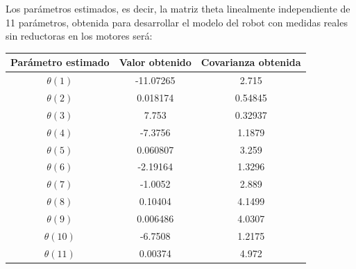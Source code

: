 Los parámetros estimados, es decir, la matriz theta linealmente independiente de 11 parámetros, obtenida para desarrollar el modelo del robot con medidas reales sin reductoras en los motores será:

\begin{center}
	
	\begin{tabular}{| c | c | c |}
		
		
		
		\hline
		
		Parámetro estimado & Valor obtenido & Covarianza obtenida \\
		
		\hline
		
		$\theta(1) $ & -11.07265 & 2.715 \\
		
		\hline
		
		$\theta(2) $ & 0.018174 & 0.54845 \\
		
		\hline
		
		$\theta(3) $ & 7.753 & 0.32937 \\
		
		\hline
		
		$\theta(4) $ & -7.3756 & 1.1879 \\
		
		\hline
		
		$\theta(5) $ & 0.060807 & 3.259 \\
		
		\hline
		
		$\theta(6) $ & -2.19164 & 1.3296 \\
		
		\hline
		
		$\theta(7) $ & -1.0052 & 2.889 \\
		
		\hline
		
		$\theta(8) $ & 0.10404 & 4.1499 \\
		
		\hline
		
		$\theta(9) $ & 0.006486 & 4.0307 \\
		
		\hline
		
		$\theta(10) $ & -6.7508 & 1.2175 \\
		
		\hline
		
		$\theta(11) $ & 0.00374 & 4.972 \\
		
		\hline
		
	\end{tabular}
	
\end{center}


